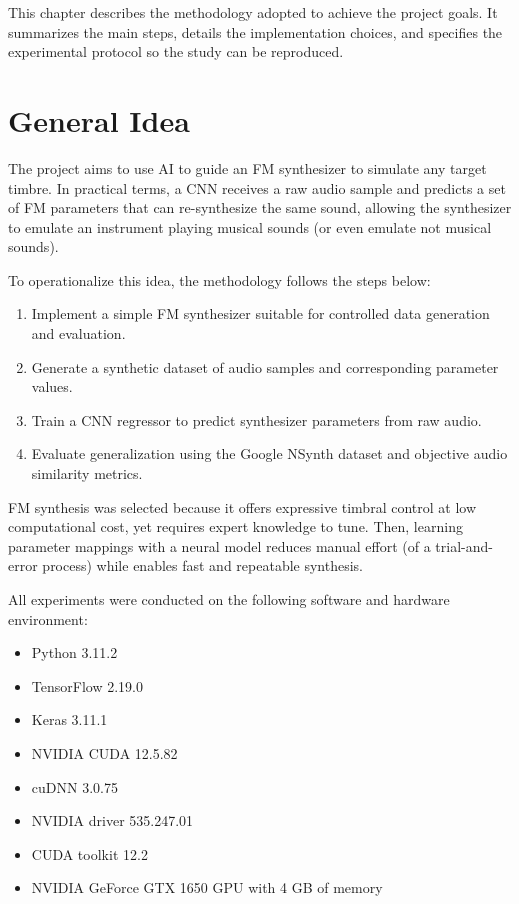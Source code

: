 This chapter describes the methodology adopted to achieve the project goals. It summarizes the main steps, details the implementation choices, and specifies the experimental protocol so the study can be reproduced.

\section{General Idea}

The project aims to use AI to guide an FM synthesizer to simulate any target timbre. In practical terms, a CNN receives a raw audio sample and predicts a set of FM parameters that can re-synthesize the same sound, allowing the synthesizer to emulate an instrument playing musical sounds (or even emulate not musical sounds).

To operationalize this idea, the methodology follows the steps below:

\begin{enumerate}
  \item Implement a simple FM synthesizer suitable for controlled data generation and evaluation.
  \item Generate a synthetic dataset of audio samples and corresponding parameter values.
  \item Train a CNN regressor to predict synthesizer parameters from raw audio.
  \item Evaluate generalization using the Google NSynth dataset and objective audio similarity metrics.
\end{enumerate}

FM synthesis was selected because it offers expressive timbral control at low computational cost, yet requires expert knowledge to tune. Then, learning parameter mappings with a neural model reduces manual effort (of a trial-and-error process) while enables fast and repeatable synthesis.

All experiments were conducted on the following software and hardware environment:

\begin{itemize}
  \item Python 3.11.2
  \item TensorFlow 2.19.0
  \item Keras 3.11.1
  \item NVIDIA CUDA 12.5.82
  \item cuDNN 3.0.75
  \item NVIDIA driver 535.247.01
  \item CUDA toolkit 12.2
  \item NVIDIA GeForce GTX 1650 GPU with 4 GB of memory
\end{itemize}

